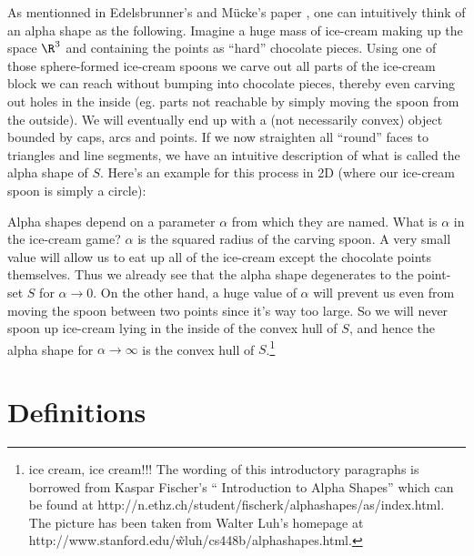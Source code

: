 As mentionned in Edelsbrunner's and M\"ucke's paper \cite{em-tdas-94},
one can intuitively think of an alpha shape  as the
following. Imagine a huge mass of ice-cream making up the space $\R^3$
and containing the points as ``hard'' chocolate pieces. Using one of
those sphere-formed ice-cream spoons we carve out all parts of the
ice-cream block we can reach without bumping into chocolate pieces,
thereby even carving out holes in the inside (eg. parts not reachable
by simply moving the spoon from the outside). We will eventually end
up with a (not necessarily convex) object bounded by caps, arcs and
points. If we now straighten all ``round'' faces to triangles and line
segments, we have an intuitive description of what is called the
alpha shape  of $S$. Here's an example for this process in 2D (where
our ice-cream spoon is simply a circle):

Alpha shapes depend on a parameter $\alpha$ from which they
are named.                                                                  
What is $\alpha$ in the ice-cream game?  $\alpha$ is the squared radius of the
carving spoon. A very small value will allow us to eat up all of the
ice-cream except the chocolate points themselves. Thus we already see
that the alpha shape  degenerates to the point-set $S$ for
$\alpha \rightarrow 0$. On the other hand, a huge value of $\alpha$
will prevent us even from moving the spoon between two points since
it's way too large. So we will never spoon up ice-cream lying in the
inside of the convex hull of $S$, and hence the alpha shape  for
$\alpha \rightarrow \infty$ is the convex hull of $S$.\footnote{ice cream, ice cream!!!
The wording of this introductory paragraphs is borrowed from  Kaspar Fischer's
`` Introduction to Alpha Shapes'' which can be found at 
http://n.ethz.ch/student/fischerk/alphashapes/as/index.html.
The picture has been taken from Walter Luh's homepage at
http://www.stanford.edu/\~wluh/cs448b/alphashapes.html.}


\section{Definitions}


